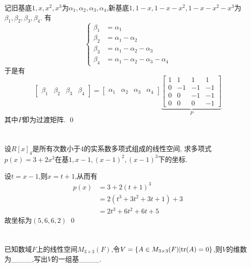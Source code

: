 \documentclass{matrix-homework}
\begin{document}
\answer
记旧基底$1,x,x^2,x^3$为$\alpha_1, \alpha_2, \alpha_3, \alpha_4$,新基底$1,1-x,1-x-x^2,1-x-x^2-x^3$为$\beta_1, \beta_2, \beta_3, \beta_4$.
有
\begin{equation*}
    \left\{
    \begin{aligned}
        \beta_1 & = \alpha_1                           \\
        \beta_2 & =\alpha_1-\alpha_2                   \\
        \beta_3 & =\alpha_1-\alpha_2-\alpha_3          \\
        \beta_4 & =\alpha_1-\alpha_2-\alpha_3-\alpha_4
    \end{aligned}
    \right.
\end{equation*}
于是有
$$
    \begin{bmatrix}
        \beta_1 & \beta_2 & \beta_3 & \beta_4
    \end{bmatrix}
    =
    \begin{bmatrix}
        \alpha_1 & \alpha_2 & \alpha_3 & \alpha_4
    \end{bmatrix}
    \underbrace{
        \begin{bmatrix}
            1 & 1  & 1  & 1  \\
            0 & -1 & -1 & -1 \\
            0 & 0  & -1 & -1 \\
            0 & 0  & 0  & -1
        \end{bmatrix}
    }_{P}
$$
其中$P$即为过渡矩阵.
\qed

\newpage
\section{}
设$R[x]_4$是所有次数小于4的实系数多项式组成的线性空间, 求多项式$p(x)=3+2x^3$在基$1,x-1,(x-1)^2,(x-1)^3$下的坐标.

\answer
设$t=x-1$,则$x=t+1$,从而有
\begin{align*}
    p(x) & = 3+2(t+1)^3                 \\
         & = 2(t^3 + 3t^2 + 3t + 1) + 3 \\
         & = 2t^3 +6t^2 +6t +5
\end{align*}
故坐标为$(5,6,6,2)$
\qed

\section{}
已知数域$F$上的线性空间$M_{3\times 3}(F)$,令$V=\{A\in M_{3\times 3}(F) | \mathrm{tr}(A)=0\}$,则$V$的维数为\_\_\_\_,写出$V$的一组基\_\_\_\_.
\end{document}
